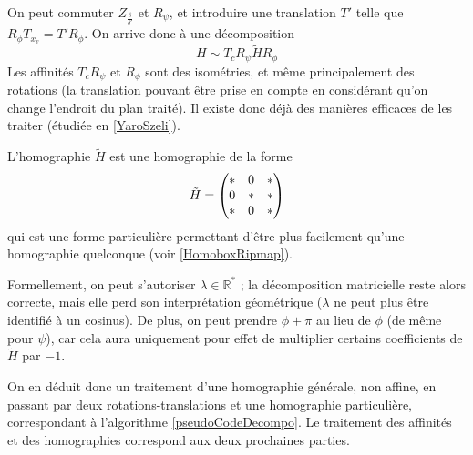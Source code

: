  On peut commuter $Z_{\frac{\delta}{\delta'}}$ et $R_{\psi}$, et introduire une translation $T'$ telle que $R_{\phi}  T_{x_{v}} = T' R_\phi$. On arrive donc à une décomposition
   \begin{equation*}
H \sim T_{c} R_{\psi}  \tilde H R_{\phi}
  \end{equation*}
  Les affinités $T_{c} R_{\psi}$ et $R_{\phi}$ sont des isométries, et même principalement des rotations (la translation pouvant être prise en compte en considérant qu'on change l'endroit du plan traité). Il existe donc déjà des manières efficaces de les traiter (étudiée en \ref{YaroSzeli}).
  
  L'homographie $\tilde H$ est une homographie de la forme
  \[\tilde H = \begin{pmatrix} *&0&*\\ 0&*&*\\ *&0&* \end{pmatrix}\]
  qui est une forme particulière permettant d'être plus facilement qu'une homographie quelconque (voir \ref{HomoboxRipmap}).
  
 Formellement, on peut s'autoriser $\lambda \in \mathbb R^*$ ; la décomposition matricielle reste alors correcte, mais elle perd son interprétation géométrique ($\lambda$ ne peut plus être identifié à un cosinus). De plus, on peut prendre $\phi + \pi$ au lieu de $\phi$ (de même pour $\psi$), car cela aura uniquement pour effet de multiplier certains coefficients de $\tilde H$ par $-1$.
 
 On en déduit donc un traitement d'une homographie générale, non affine, en passant par deux rotations-translations et une homographie particulière, correspondant à l'algorithme \ref{pseudoCodeDecompo}. Le traitement des affinités et des homographies correspond aux deux prochaines parties.
		
